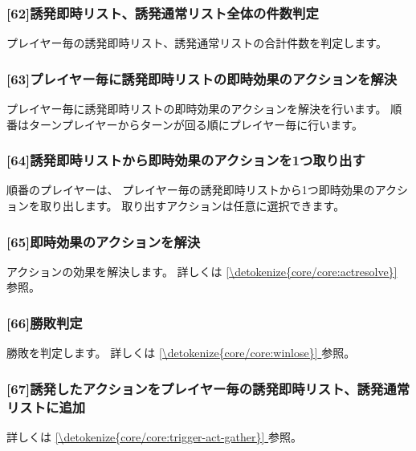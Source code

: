 \documentclass[letterpaper,10pt,dvipdfmx]{sphinxmanual}
\begin{document}
\subsubsection{{[}6\sphinxhyphen{}2{]}誘発即時リスト、誘発通常リスト全体の件数判定}
\label{\detokenize{core/core:id31}}
\sphinxAtStartPar
プレイヤー毎の誘発即時リスト、誘発通常リストの合計件数を判定します。


\subsubsection{{[}6\sphinxhyphen{}3{]}プレイヤー毎に誘発即時リストの即時効果のアクションを解決}
\label{\detokenize{core/core:id32}}
\sphinxAtStartPar
プレイヤー毎に誘発即時リストの即時効果のアクションを解決を行います。
順番はターンプレイヤーからターンが回る順にプレイヤー毎に行います。


\subsubsection{{[}6\sphinxhyphen{}4{]}誘発即時リストから即時効果のアクションを1つ取り出す}
\label{\detokenize{core/core:id33}}
\sphinxAtStartPar
順番のプレイヤーは、 プレイヤー毎の誘発即時リストから1つ即時効果のアクションを取り出します。
取り出すアクションは任意に選択できます。


\subsubsection{{[}6\sphinxhyphen{}5{]}即時効果のアクションを解決}
\label{\detokenize{core/core:id34}}
\sphinxAtStartPar
アクションの効果を解決します。
詳しくは \hyperref[\detokenize{core/core:actresolve}]{\ref{\detokenize{core/core:actresolve}} } 参照。


\subsubsection{{[}6\sphinxhyphen{}6{]}勝敗判定}
\label{\detokenize{core/core:id35}}
\sphinxAtStartPar
勝敗を判定します。
詳しくは \hyperref[\detokenize{core/core:winlose}]{\ref{\detokenize{core/core:winlose}} } 参照。


\subsubsection{{[}6\sphinxhyphen{}7{]}誘発したアクションをプレイヤー毎の誘発即時リスト、誘発通常リストに追加}
\label{\detokenize{core/core:id36}}
\sphinxAtStartPar
詳しくは \hyperref[\detokenize{core/core:trigger-act-gather}]{\ref{\detokenize{core/core:trigger-act-gather}} } 参照。
\end{document}
